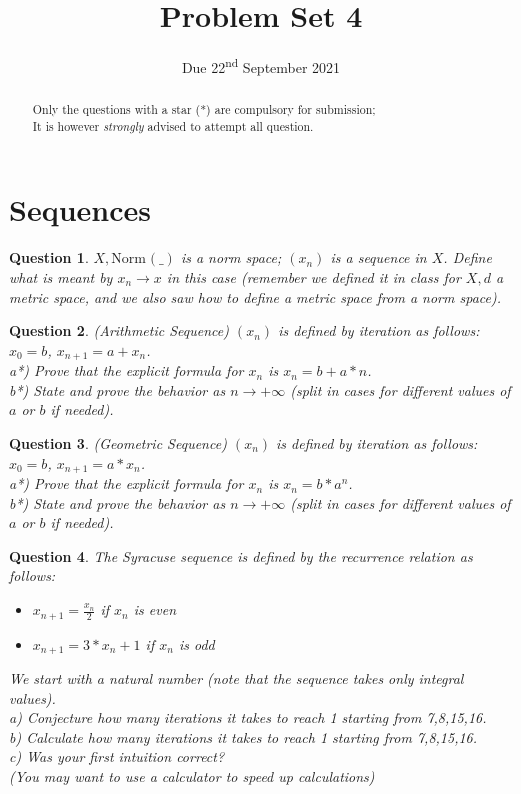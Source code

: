 \documentclass[]{article}
\title{Problem Set 4}
\author{}
\date{Due 22\textsuperscript{nd} September 2021}
\newtheorem{question}{Question}
\newcommand{\norm}[2][]{\text{Norm}_{#1}(#2)}
\begin{document}
\maketitle

\begin{abstract}
	Only the questions with a star (*) are compulsory for submission;\\
	It is however \textit{strongly} advised to attempt all question.
\end{abstract}

\section{Sequences}
\begin{question}
	$X,\norm{\_}$ is a norm space; $(x_n)$ is a sequence in $X$.
	Define what is meant by $x_n \to x$ in this case (remember we defined it in class for $X,d$ a metric space, and we also saw how to define a metric space from a norm space).
\end{question}

\begin{question}(Arithmetic Sequence)
	$(x_n)$ is defined by iteration as follows: $x_0=b$, $x_{n+1}=a+x_n$.\\
	a*) Prove that the explicit formula for $x_n$ is $x_n=b+a*n$.\\
	b*) State and prove the behavior as $n \to +\infty$ (split in cases for different values of $a$ or $b$ if needed).
\end{question}
\begin{question}(Geometric  Sequence)
	$(x_n)$ is defined by iteration as follows: $x_0=b$, $x_{n+1}=a*x_n$.\\
	a*) Prove that the explicit formula for $x_n$ is $x_n=b*a^n$.\\
	b*) State and prove the behavior as $n \to +\infty$ (split in cases for different values of $a$ or $b$ if needed).
\end{question}

\begin{question}
	The Syracuse sequence is defined by the recurrence relation as follows:
	\begin{itemize}
		\item $x_{n+1}=\frac{x_n}{2}$ if $x_n$ is even
		\item $x_{n+1}=3*x_n+1$ if $x_n$ is odd
	\end{itemize}
	We start with a natural number (note that the sequence takes only integral values).\\
	a) Conjecture how many iterations it takes to reach 1 starting from 7,8,15,16.\\
	b) Calculate how many iterations it takes to reach 1 starting from 7,8,15,16.\\
	c) Was your first intuition correct?\\
	(You may want to use a calculator to speed up calculations)
\end{question}
\end{document}
